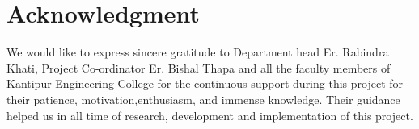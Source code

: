 \chapter*{Acknowledgment}
We would like to express sincere gratitude to Department head Er. Rabindra Khati, Project Co-ordinator Er. Bishal Thapa and all the faculty members of Kantipur Engineering College for the continuous support during this project for their patience, motivation,enthusiasm, and immense knowledge. Their guidance helped us in all time of research, development and implementation of this project.   \par
\begin{flushright}
\vskip -20pt
\submittedBy

\end{flushright}

{
\KECadjusttocspacings %
\makeatletter
\def\@makeschapterhead#1{%
  {\newpage \parindent \z@ \raggedright
    \normalfont
    \interlinepenalty\@M
    \center \fontsize{16pt}{1} \bfseries \MakeUppercase{#1}\par\nobreak
  }}
\makeatother 

\tableofcontents %
\listoffigures %
}
